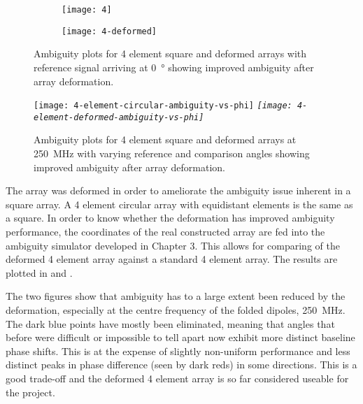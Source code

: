 \begin{figure}
  \centering
  \begin{subfigure}{\textwidth}
    \centering
    \texttt{[image: 4]}
  \end{subfigure}
  \begin{subfigure}{\textwidth}
    \centering
    \texttt{[image: 4-deformed]}
  \end{subfigure}
  \caption{Ambiguity plots for 4 element square and deformed arrays with reference signal arriving at \SI{0}{\degree} showing improved ambiguity after array deformation.}
  \label{fig:antenna-array:deformed-vs-normal-over-frequency}
\end{figure}

\begin{figure}
  \centering
  \texttt{[image: 4-element-circular-ambiguity-vs-phi]} \em \em
  \texttt{[image: 4-element-deformed-ambiguity-vs-phi]}
  \caption{Ambiguity plots for 4 element square and deformed arrays at \SI{250}{\mega\hertz} with varying reference and comparison angles showing improved ambiguity after array deformation.}
  \label{fig:antenna-array:deformed-vs-normal-over-angle}
\end{figure}

The array was deformed in order to ameliorate the ambiguity issue inherent in a square array. A 4 element circular array with equidistant elements is the same as a square. In order to know whether the deformation has improved ambiguity performance, the coordinates of the real constructed array are fed into the ambiguity simulator developed in Chapter 3. This allows for comparing of the deformed 4 element array against a standard 4 element array. The results are plotted in  and .

The two figures show that ambiguity has to a large extent been reduced by the deformation, especially at the centre frequency of the folded dipoles, \SI{250}{\mega\hertz}. The dark blue points have mostly been eliminated, meaning that angles that before were difficult or impossible to tell apart now exhibit more distinct baseline phase shifts. This is at the expense of slightly non-uniform performance and less distinct peaks in phase difference (seen by dark reds) in some directions. This is a good trade-off and the deformed 4 element array is so far considered useable for the project.\\

